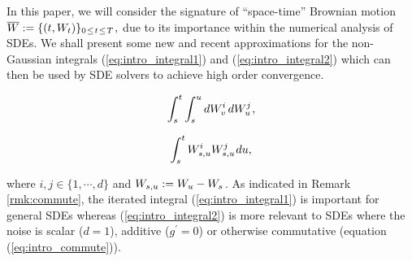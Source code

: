 \documentclass[sn-mathphys-num]{sn-jnl}%
\newcommand{\m}{\hspace{0.25mm}}
\begin{document}
In this paper, we will consider the signature of ``space-time'' Brownian motion $\overline{W} := \{(t, W_t)\}_{0\m\leq\m t\m\leq\m T}\m,$ due to its importance within the numerical analysis of SDEs.
We shall present some new and recent approximations for the non-Gaussian integrals (\ref{eq:intro_integral1}) and (\ref{eq:intro_integral2}) which can then be used by SDE solvers to achieve high order convergence.
\noindent\begin{minipage}{.5\linewidth}
\begin{align}\label{eq:intro_integral1}
\int_s^t \int_s^u  dW_v^i\, dW_u^j\m, 
\end{align}
\end{minipage}%
\begin{minipage}{.5\linewidth}
\begin{align}\label{eq:intro_integral2}
\int_s^t W_{s,u}^i W_{s,u}^j\m du, 
\end{align}
\end{minipage}\bigbreak\noindent
where $i,j\in\{1,\cdots, d\}$ and $W_{s,u} := W_u - W_s\m$. As indicated in Remark \ref{rmk:commute}, the iterated integral (\ref{eq:intro_integral1}) is important for general SDEs whereas (\ref{eq:intro_integral2}) is more relevant to SDEs where the noise is scalar ($d=1$), additive ($g^\prime = 0$) or otherwise commutative (equation (\ref{eq:intro_commute})).
\medbreak
\end{document}
